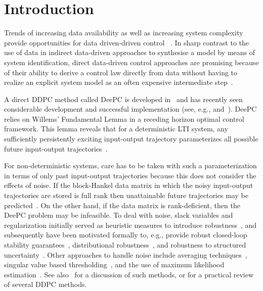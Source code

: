 \section{Introduction}\label{sec:introduction}
\noindent Trends of increasing data availability as well as increasing system complexity provide opportunities for data driven-driven control%
~\citep{Hou2013}. %
In sharp contrast to the use of data in %
indirect data-driven approaches to synthesise a model by means of system identification, direct data-driven control approaches are promising because of their ability to derive a control law directly from data without having to realize an explicit system model as an often expensive intermediate step~\citep{Hjalmarsson2005}.

A direct \ac{DDPC} method called \acf{DeePC} is developed in~\cite{Coulson2019} and has recently seen considerable development and successful implementation (see, e.g., \citet{Markovsky2023} and~\citet{Breschi2023a}). \ac{DeePC} relies on Willems' Fundamental Lemma in a receding horizon optimal control framework. This lemma reveals that for a deterministic \ac{LTI} system, any sufficiently persistently exciting input-output trajectory parameterizes all possible future input-output trajectories~\citep{Willems2005}.

For non-deterministic systems, care has to be taken with such a parameterization in terms of only past input-output trajectories because this does not consider the effects of noise. If the block-Hankel data matrix in which the noisy input-output trajectories are stored is full rank then unattainable future trajectories may be predicted~\citep{Markovsky2023}. On the other hand, if the data matrix is rank-deficient, then the \ac{DeePC} problem may be infeasible. To deal with noise, slack variables and regularization initially served as heuristic measures to introduce robustness~\citep{Coulson2019}, and subsequently have been motivated formally to, e.g., provide robust closed-loop stability guarantees~\citep{Berberich2021}, distributional robustness~\citep{Coulson2019a}, and robustness to structured uncertainty~\citep{Huang2023}. Other approaches to handle noise include averaging techniques~\citep{Jo2022}, singular value based thresholding~\citep{Sassella2022}, and the use of maximum likelihood estimation~\citep{Yin2023}. See also~\cite{Sassella2023} for a discussion of such methods, or \cite{Verheijen2023} for a practical review of several \ac{DDPC} methods.%


